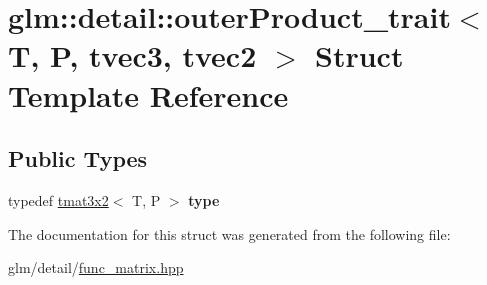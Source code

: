 \hypertarget{structglm_1_1detail_1_1outerProduct__trait_3_01T_00_01P_00_01tvec3_00_01tvec2_01_4}{\section{glm\-:\-:detail\-:\-:outer\-Product\-\_\-trait$<$ T, P, tvec3, tvec2 $>$ Struct Template Reference}
\label{structglm_1_1detail_1_1outerProduct__trait_3_01T_00_01P_00_01tvec3_00_01tvec2_01_4}
}
\subsection*{Public Types}
\begin{DoxyCompactItemize}
\item 
\hypertarget{structglm_1_1detail_1_1outerProduct__trait_3_01T_00_01P_00_01tvec3_00_01tvec2_01_4_a241608939fa083f2ddb7c701be75a732}{typedef \hyperlink{structglm_1_1tmat3x2}{tmat3x2}$<$ T, P $>$ {\bfseries type}}\label{structglm_1_1detail_1_1outerProduct__trait_3_01T_00_01P_00_01tvec3_00_01tvec2_01_4_a241608939fa083f2ddb7c701be75a732}

\end{DoxyCompactItemize}


The documentation for this struct was generated from the following file\-:\begin{DoxyCompactItemize}
\item 
glm/detail/\hyperlink{func__matrix_8hpp}{func\-\_\-matrix.\-hpp}\end{DoxyCompactItemize}
